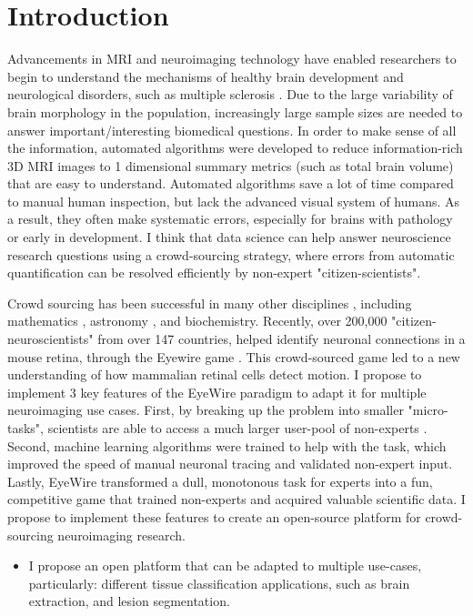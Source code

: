 \section{Introduction}

Advancements in MRI and neuroimaging technology have enabled researchers to begin to understand the mechanisms of healthy brain development \cite{giedd1999brain} and neurological disorders, such as multiple sclerosis \cite{bakshi2008mri}. Due to the large variability of brain morphology in the population, increasingly large sample sizes are needed to answer important/interesting biomedical questions. In order to make sense of all the information, automated algorithms were developed to reduce information-rich 3D MRI images to 1 dimensional summary metrics (such as total brain volume) that are easy to understand. Automated algorithms save a lot of time compared to manual human inspection, but lack the advanced visual system of humans. As a result, they often make systematic errors, especially for brains with pathology or early in development. I think that data science can help answer neuroscience research questions using a crowd-sourcing strategy, where errors from automatic quantification can be resolved efficiently by non-expert "citizen-scientists".

Crowd sourcing has been successful in many other disciplines \cite{wiggins2011conservation}, including mathematics \cite{cranshaw2011polymath}, astronomy \cite{lintott2008galaxy}, and biochemistry\cite{eiben2012increased}. Recently, over 200,000 "citizen-neuroscientists"  from over 147 countries, helped identify neuronal connections in a mouse retina, through the Eyewire game \cite{kim2014space}. This crowd-sourced game led to a new understanding of how mammalian retinal cells detect motion. I propose to implement 3 key features of the EyeWire paradigm to adapt it for multiple neuroimaging use cases. First, by breaking up the problem into smaller "micro-tasks", scientists are able to access a much larger user-pool of non-experts \cite{kittur2008crowdsourcing}. Second, machine learning algorithms were trained to help with the task, which improved the speed of manual neuronal tracing and validated non-expert input. Lastly, EyeWire transformed a dull, monotonous task for experts into a fun, competitive game that trained non-experts and acquired valuable scientific data. I propose to implement these features to create an open-source platform for crowd-sourcing neuroimaging research.


\begin{itemize}

\item I propose an open platform that can be adapted to multiple use-cases, particularly: different tissue classification applications, such as brain extraction, and lesion segmentation. 
\end{itemize}

